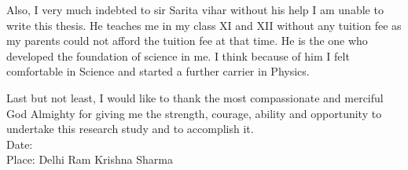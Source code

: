 Also, I very much indebted to sir Sarita vihar without his help I am unable to write this thesis. He teaches me in my class XI and XII without any tuition fee as my parents could not afford the tuition fee at that time. He is the one who developed the foundation of science in me. I think because of him I felt comfortable in Science and started a further carrier in Physics.

Last but not least, I would like to thank the most compassionate and merciful God Almighty for giving me the strength, courage, ability and opportunity to undertake this research study and to accomplish it.\\[3.0cm]
Date:\\
Place: Delhi \hfill Ram Krishna Sharma
